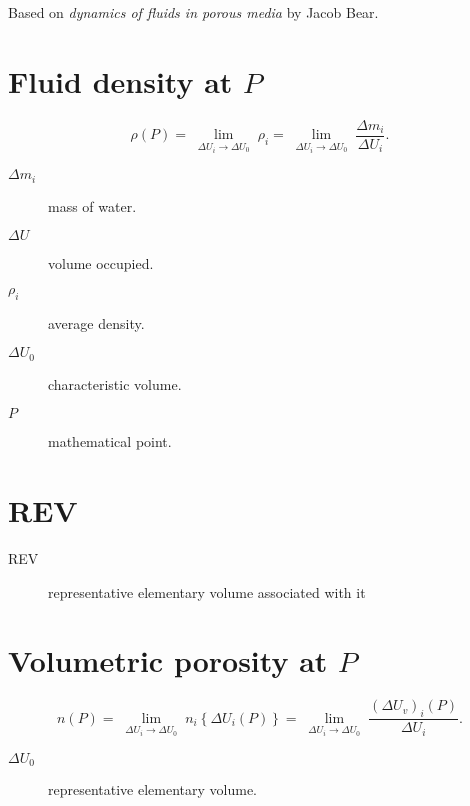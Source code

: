 \documentclass[
paper=a5paper,
fontsize=15]{scrreport}
\begin{document}
Based on \emph{dynamics of fluids in porous media} by Jacob Bear.

\tableofcontents

\section{Fluid density at $P$}

\begin{equation*}
\boxed{
\rho\left(P\right) =
\lim\limits_{\substack{\Delta U_{i}\to\Delta U_{0}}}\rho_{i} =
\lim\limits_{\substack{\Delta U_{i}\to\Delta U_{0}}}\frac{\Delta m_{i}}{\Delta U_{i}}.
}
\end{equation*}

\begin{description}
	\item[$\Delta m_{i}$] mass of water.
	\item[$\Delta U$] volume occupied.
	\item[$\rho_{i}$] average density.
	\item[$\Delta U_{0}$] characteristic volume.
	\item[$P$] mathematical point.
\end{description}

\section{REV}

\begin{description}
	\item[REV] representative elementary volume associated with it
\end{description}

\section{Volumetric porosity at $P$}

\begin{equation*}
\boxed{
n\left(P\right) =
\lim\limits_{\substack{\Delta U_{i}\to\Delta U_{0}}}n_{i}\left\{\Delta U_{i}\left(P\right)\right\} =
\lim\limits_{\substack{\Delta U_{i}\to\Delta U_{0}}}
\frac{\left(\Delta U_{v}\right)_{i}\left(P\right)}{\Delta U_{i}}.
}
\end{equation*}

\begin{description}
	\item[$\Delta U_{0}$] representative elementary volume.
\end{description}
\end{document}
